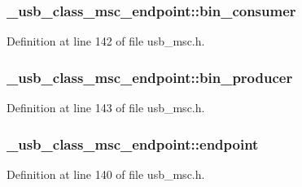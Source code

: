 \subsubsection[{\texorpdfstring{bin\+\_\+consumer}{bin_consumer}}]{ \+\_\+usb\+\_\+class\+\_\+msc\+\_\+endpoint\+::bin\+\_\+consumer}\hypertarget{struct__usb__class__msc__endpoint_ac6a3940a04987219c25919402695decd}{}\label{struct__usb__class__msc__endpoint_ac6a3940a04987219c25919402695decd}


Definition at line 142 of file usb\+\_\+msc.\+h.

\subsubsection[{\texorpdfstring{bin\+\_\+producer}{bin_producer}}]{ \+\_\+usb\+\_\+class\+\_\+msc\+\_\+endpoint\+::bin\+\_\+producer}\hypertarget{struct__usb__class__msc__endpoint_a00832946458d7c10ffb9ab50902e2ad8}{}\label{struct__usb__class__msc__endpoint_a00832946458d7c10ffb9ab50902e2ad8}


Definition at line 143 of file usb\+\_\+msc.\+h.

\subsubsection[{\texorpdfstring{endpoint}{endpoint}}]{ \+\_\+usb\+\_\+class\+\_\+msc\+\_\+endpoint\+::endpoint}\hypertarget{struct__usb__class__msc__endpoint_af13c97fb9746b6f147e6e4a69fb40687}{}\label{struct__usb__class__msc__endpoint_af13c97fb9746b6f147e6e4a69fb40687}


Definition at line 140 of file usb\+\_\+msc.\+h.

